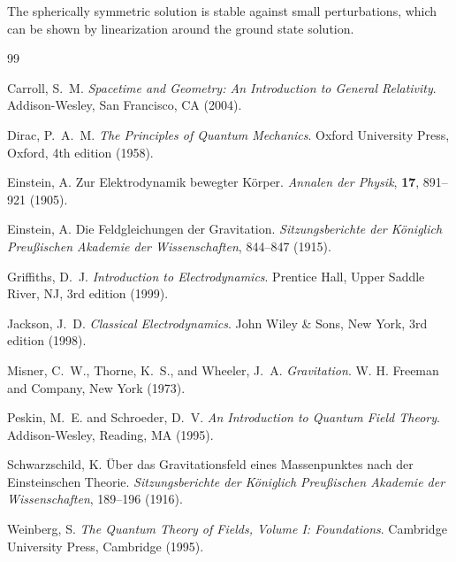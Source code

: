 	The spherically symmetric solution is stable against small perturbations, which can be shown by linearization around the ground state solution.

\begin{thebibliography}{99}
	
	Carroll, S.~M.
	\newblock \textit{Spacetime and Geometry: An Introduction to General Relativity}.
	\newblock Addison-Wesley, San Francisco, CA (2004).
	
	Dirac, P.~A.~M.
	\newblock \textit{The Principles of Quantum Mechanics}.
	\newblock Oxford University Press, Oxford, 4th edition (1958).
	
	Einstein, A.
	\newblock Zur Elektrodynamik bewegter Körper.
	\newblock \textit{Annalen der Physik}, \textbf{17}, 891--921 (1905).
	
	Einstein, A.
	\newblock Die Feldgleichungen der Gravitation.
	\newblock \textit{Sitzungsberichte der Königlich Preußischen Akademie der Wissenschaften}, 844--847 (1915).
	
	Griffiths, D.~J.
	\newblock \textit{Introduction to Electrodynamics}.
	\newblock Prentice Hall, Upper Saddle River, NJ, 3rd edition (1999).
	
	Jackson, J.~D.
	\newblock \textit{Classical Electrodynamics}.
	\newblock John Wiley \& Sons, New York, 3rd edition (1998).
	
	Misner, C.~W., Thorne, K.~S., and Wheeler, J.~A.
	\newblock \textit{Gravitation}.
	\newblock W. H. Freeman and Company, New York (1973).
	
	Peskin, M.~E. and Schroeder, D.~V.
	\newblock \textit{An Introduction to Quantum Field Theory}.
	\newblock Addison-Wesley, Reading, MA (1995).
	
	Schwarzschild, K.
	\newblock Über das Gravitationsfeld eines Massenpunktes nach der Einsteinschen Theorie.
	\newblock \textit{Sitzungsberichte der Königlich Preußischen Akademie der Wissenschaften}, 189--196 (1916).
	
	Weinberg, S.
	\newblock \textit{The Quantum Theory of Fields, Volume I: Foundations}.
	\newblock Cambridge University Press, Cambridge (1995).
	
\end{thebibliography}